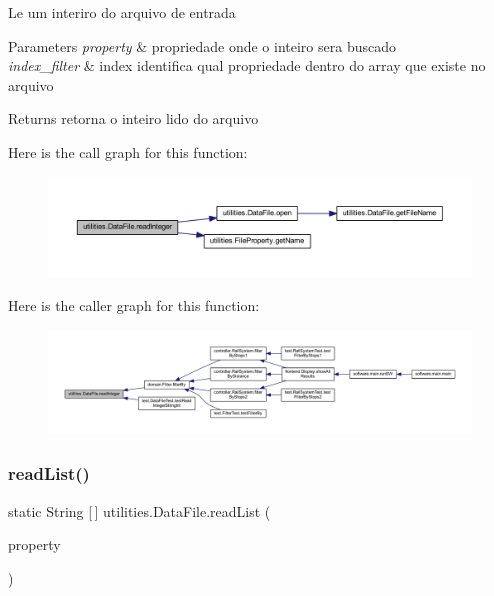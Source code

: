Le um interiro do arquivo de entrada 
\begin{DoxyParams}{Parameters}
{\em property} & propriedade onde o inteiro sera buscado \\
\hline
{\em index\+\_\+filter} & index identifica qual propriedade dentro do array que existe no arquivo \\
\hline
\end{DoxyParams}
\begin{DoxyReturn}{Returns}
retorna o inteiro lido do arquivo 
\end{DoxyReturn}
Here is the call graph for this function\+:\nopagebreak
\begin{figure}[H]
\begin{center}
\leavevmode
\includegraphics[width=350pt]{classutilities_1_1_data_file_a7576f90d40db372f262216f8f6a64c28_cgraph}
\end{center}
\end{figure}
Here is the caller graph for this function\+:\nopagebreak
\begin{figure}[H]
\begin{center}
\leavevmode
\includegraphics[width=350pt]{classutilities_1_1_data_file_a7576f90d40db372f262216f8f6a64c28_icgraph}
\end{center}
\end{figure}
\mbox{\label{classutilities_1_1_data_file_a68332bb2b70bafbaae007d952ba4264b}} 
\subsubsection{\texorpdfstring{read\+List()}{readList()}\hspace{0.1cm}{\footnotesize\ttfamily [1/2]}}
{\footnotesize\ttfamily static String \mbox{[}$\,$\mbox{]} utilities.\+Data\+File.\+read\+List (\begin{DoxyParamCaption}\item[{\hyperlink{enumutilities_1_1_file_property}{File\+Property}}]{property }\end{DoxyParamCaption})\hspace{0.3cm}{\ttfamily [static]}}

